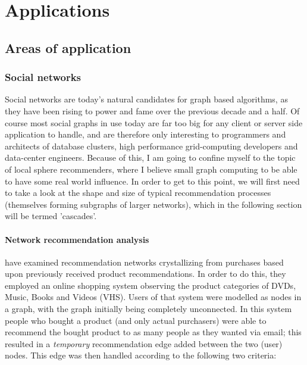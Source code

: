 \chapter{Applications}
\label{ch:applications}


\section{Areas of application}
\label{sect:app_areas}

	\subsection{Social networks}
	\label{ssect:social_networks}
	
	Social networks are today's natural candidates for graph based algorithms, as they have been rising to power and fame over the previous decade and a half. Of course most social graphs in use today are far too big for any client or server side application to handle, and are therefore only interesting to programmers and architects of database clusters, high performance grid-computing developers and data-center engineers. Because of this, I am going to confine myself to the topic of local sphere recommenders, where I believe small graph computing to be able to have some real world influence. In order to get to this point, we will first need to take a look at the shape and size of typical recommendation processes (themselves forming subgraphs of larger networks), which in the following section will be termed 'cascades'.
	
	
	\subsubsection{Network recommendation analysis}
	\label{sssect:net_rec_anal}
	
	\citet{RecCascades} have examined recommendation networks crystallizing from purchases based upon previously received product recommendations. In order to do this, they employed an online shopping system observing the product categories of DVDs, Music, Books and Videos (VHS). Users of that system were modelled as nodes in a graph, with the graph initially being completely unconnected. In this system people who bought a product (and only actual purchasers) were able to recommend the bought product to as many people  as they wanted via email; this resulted in a \textit{temporary} recommendation edge added between the two (user) nodes. This edge was then handled according to the following two criteria:
	
